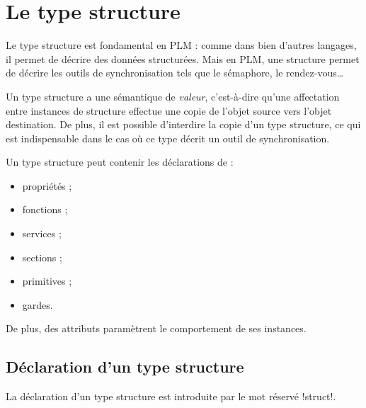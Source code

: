 




\chapter{Le type structure}


Le type structure est fondamental en PLM : comme dans bien d'autres langages, il permet de décrire des données structurées. Mais en PLM, une structure permet de décrire les outils de synchronisation tels que le sémaphore, le rendez-vous…

Un type structure a une sémantique de \emph{valeur}, c'est-à-dire qu'une affectation entre instances de structure effectue une copie de l'objet source vers l'objet destination. De plus, il est possible d'interdire la copie d'un type structure, ce qui est indispensable dans le cas où ce type décrit un outil de synchronisation.

Un type structure peut contenir les déclarations de :
\begin{itemize}
\item propriétés ;
\item fonctions ;
\item services ;
\item sections ;
\item primitives ;
\item gardes.
\end{itemize}

De plus, des attributs paramètrent le comportement de ses instances.











\section{Déclaration d'un type structure}

La déclaration d'un type structure est introduite par le mot réservé \plm!struct!.


